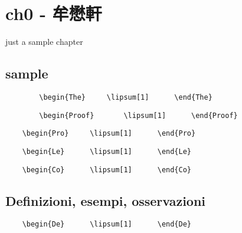 \chapter{ch0 - 牟懋軒}
just a sample chapter

\section{sample}
	\begin{verbatim}
		\begin{The}		\lipsum[1]		\end{The}
	\end{verbatim}
\begin{The}		\lipsum[1]		\end{The}

	\begin{verbatim}
		\begin{Proof}		\lipsum[1]		\end{Proof}
	\end{verbatim}
\begin{Proof}	\lipsum[2]		\end{Proof}

\begin{verbatim}
	\begin{Pro}		\lipsum[1]		\end{Pro}
\end{verbatim}
\begin{Pro}		\lipsum[3] 		\end{Pro}

\begin{verbatim}
	\begin{Le}		\lipsum[1]		\end{Le}
\end{verbatim}
\begin{Le}			\lipsum[5]		\end{Le}

\begin{verbatim}
	\begin{Co}		\lipsum[1]		\end{Co}
\end{verbatim}
\begin{Co}		\lipsum[6]		\end{Co}
\section{Definizioni, esempi, osservazioni}
\begin{verbatim}
	\begin{De}		\lipsum[1]		\end{De}
\end{verbatim}
\begin{De}		\lipsum[7]		\end{De}

